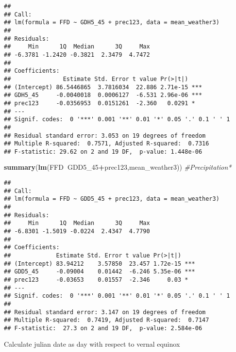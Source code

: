 \documentclass[10pt,]{article}
\newenvironment{Shaded}{\begin{snugshade}}{\end{snugshade}}
\newcommand{\KeywordTok}[1]{\textcolor[rgb]{0.13,0.29,0.53}{\textbf{#1}}}
\newcommand{\DecValTok}[1]{\textcolor[rgb]{0.00,0.00,0.81}{#1}}
\newcommand{\CommentTok}[1]{\textcolor[rgb]{0.56,0.35,0.01}{\textit{#1}}}
\newcommand{\OperatorTok}[1]{\textcolor[rgb]{0.81,0.36,0.00}{\textbf{#1}}}
\newcommand{\NormalTok}[1]{#1}
\begin{document}
\begin{verbatim}
## 
## Call:
## lm(formula = FFD ~ GDH5_45 + prec123, data = mean_weather3)
## 
## Residuals:
##     Min      1Q  Median      3Q     Max 
## -6.3781 -1.2420 -0.3821  2.3479  4.7472 
## 
## Coefficients:
##               Estimate Std. Error t value Pr(>|t|)    
## (Intercept) 86.5446865  3.7816034  22.886 2.71e-15 ***
## GDH5_45     -0.0040018  0.0006127  -6.531 2.96e-06 ***
## prec123     -0.0356953  0.0151261  -2.360   0.0291 *  
## ---
## Signif. codes:  0 '***' 0.001 '**' 0.01 '*' 0.05 '.' 0.1 ' ' 1
## 
## Residual standard error: 3.053 on 19 degrees of freedom
## Multiple R-squared:  0.7571, Adjusted R-squared:  0.7316 
## F-statistic: 29.62 on 2 and 19 DF,  p-value: 1.448e-06
\end{verbatim}

\begin{Shaded}
\begin{Highlighting}[]
\KeywordTok{summary}\NormalTok{(}\KeywordTok{lm}\NormalTok{(FFD}\OperatorTok{~}\NormalTok{GDD5_}\DecValTok{45}\OperatorTok{+}\NormalTok{prec123,mean_weather3)) }\CommentTok{#Precipitation*}
\end{Highlighting}
\end{Shaded}

\begin{verbatim}
## 
## Call:
## lm(formula = FFD ~ GDD5_45 + prec123, data = mean_weather3)
## 
## Residuals:
##     Min      1Q  Median      3Q     Max 
## -6.8301 -1.5019 -0.0224  2.4347  4.7790 
## 
## Coefficients:
##             Estimate Std. Error t value Pr(>|t|)    
## (Intercept) 83.94212    3.57850  23.457 1.72e-15 ***
## GDD5_45     -0.09004    0.01442  -6.246 5.35e-06 ***
## prec123     -0.03653    0.01557  -2.346     0.03 *  
## ---
## Signif. codes:  0 '***' 0.001 '**' 0.01 '*' 0.05 '.' 0.1 ' ' 1
## 
## Residual standard error: 3.147 on 19 degrees of freedom
## Multiple R-squared:  0.7419, Adjusted R-squared:  0.7147 
## F-statistic:  27.3 on 2 and 19 DF,  p-value: 2.584e-06
\end{verbatim}

Calculate julian date as day with respect to vernal equinox

\begin{Shaded}
\end{Shaded}
\end{document}
